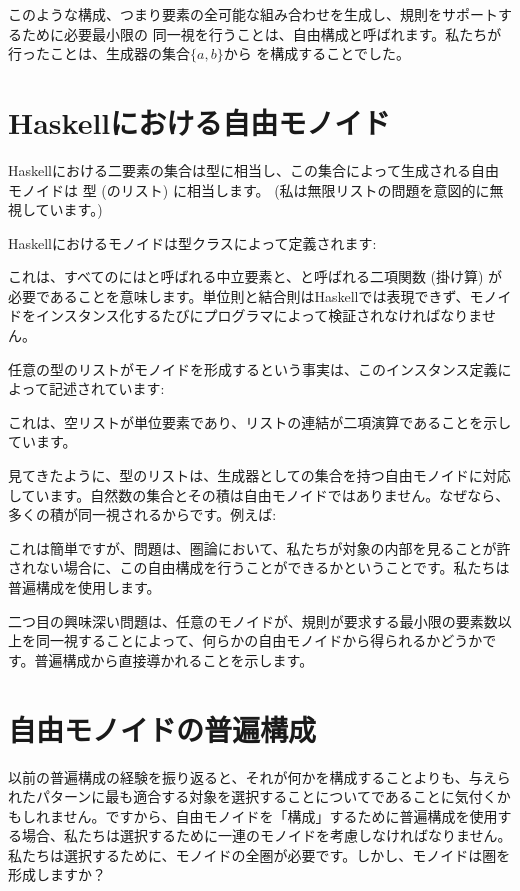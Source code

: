 このような構成、つまり要素の全可能な組み合わせを生成し、規則をサポートするために必要最小限の
同一視を行うことは、自由構成と呼ばれます。私たちが行ったことは、生成器の集合$\{a, b\}$から
を構成することでした。

\section{Haskellにおける自由モノイド}

Haskellにおける二要素の集合は型に相当し、この集合によって生成される自由モノイドは
\code{{[}Bool{]}}型 (のリスト) に相当します。 (私は無限リストの問題を意図的に無視しています。) 

Haskellにおけるモノイドは型クラスによって定義されます: 

これは、すべてのにはと呼ばれる中立要素と、と呼ばれる二項関数 (掛け算) が必要であることを意味します。単位則と結合則はHaskellでは表現できず、モノイドをインスタンス化するたびにプログラマによって検証されなければなりません。

任意の型のリストがモノイドを形成するという事実は、このインスタンス定義によって記述されています: 

これは、空リスト\code{{[}{]}}が単位要素であり、リストの連結\code{(++)}が二項演算であることを示しています。

見てきたように、型のリストは、生成器としての集合を持つ自由モノイドに対応しています。自然数の集合とその積は自由モノイドではありません。なぜなら、多くの積が同一視されるからです。例えば: 

これは簡単ですが、問題は、圏論において、私たちが対象の内部を見ることが許されない場合に、この自由構成を行うことができるかということです。私たちは普遍構成を使用します。

二つ目の興味深い問題は、任意のモノイドが、規則が要求する最小限の要素数以上を同一視することによって、何らかの自由モノイドから得られるかどうかです。普遍構成から直接導かれることを示します。

\section{自由モノイドの普遍構成}

以前の普遍構成の経験を振り返ると、それが何かを構成することよりも、与えられたパターンに最も適合する対象を選択することについてであることに気付くかもしれません。ですから、自由モノイドを「構成」するために普遍構成を使用する場合、私たちは選択するために一連のモノイドを考慮しなければなりません。私たちは選択するために、モノイドの全圏が必要です。しかし、モノイドは圏を形成しますか？

